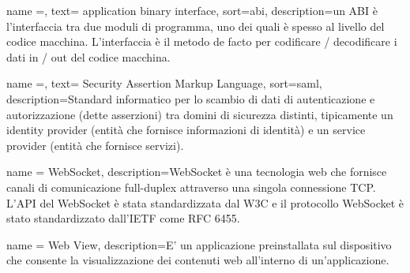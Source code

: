 {
    name =,
    text= {application binary interface},
    sort=abi,
    description={un ABI è l'interfaccia tra due moduli di programma, uno dei quali è spesso al livello del codice macchina. L'interfaccia è il metodo de facto per codificare / decodificare i dati in / out del codice macchina.}
}

{
    name =,
    text= {Security Assertion Markup Language},
    sort=saml,
    description={Standard informatico per lo scambio di dati di autenticazione e autorizzazione
    (dette asserzioni) tra domini di sicurezza distinti, tipicamente un identity provider
    (entità che fornisce informazioni di identità) e un service provider (entità che
    fornisce servizi).}
}


{
    name = {WebSocket},
    description={WebSocket è una tecnologia web che fornisce canali di comunicazione full-duplex attraverso una singola connessione TCP. L'API del WebSocket è stata standardizzata dal W3C e il protocollo WebSocket è stato standardizzato dall'IETF come RFC 6455.}
}

{
    name = {Web View},
    description={E' un applicazione preinstallata sul dispositivo che consente la visualizzazione dei contenuti web all'interno di un'applicazione.}
}
